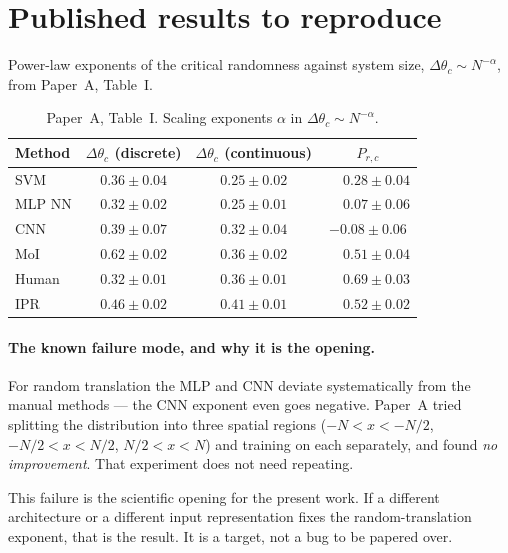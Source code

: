 \documentclass[11pt]{article}
\newcommand{\dthetac}{\Delta\theta_{c}}             %
\newcommand{\Prandc}{P_{r,c}}                       %
\begin{document}
\section{Published results to reproduce}
\label{sec:published}

Power-law exponents of the critical randomness against system size,
$\dthetac \sim N^{-\alpha}$, from Paper~A, Table~I.

\begin{table}[h]
\centering
\begin{tabular}{lccc}
\toprule
\textbf{Method} & $\dthetac$ (discrete) & $\dthetac$ (continuous) & $\Prandc$ \\
\midrule
SVM    & $0.36 \pm 0.04$ & $0.25 \pm 0.02$ & $\phantom{-}0.28 \pm 0.04$ \\
MLP NN & $0.32 \pm 0.02$ & $0.25 \pm 0.01$ & $\phantom{-}0.07 \pm 0.06$ \\
CNN    & $0.39 \pm 0.07$ & $0.32 \pm 0.04$ & $-0.08 \pm 0.06$ \\
MoI    & $0.62 \pm 0.02$ & $0.36 \pm 0.02$ & $\phantom{-}0.51 \pm 0.04$ \\
Human  & $0.32 \pm 0.01$ & $0.36 \pm 0.01$ & $\phantom{-}0.69 \pm 0.03$ \\
IPR    & $0.46 \pm 0.02$ & $0.41 \pm 0.01$ & $\phantom{-}0.52 \pm 0.02$ \\
\bottomrule
\end{tabular}
\caption{Paper~A, Table~I. Scaling exponents $\alpha$ in $\dthetac \sim N^{-\alpha}$.}
\label{tab:paperA}
\end{table}

\paragraph{The known failure mode, and why it is the opening.}
For random translation the MLP and CNN deviate systematically from the manual
methods --- the CNN exponent even goes negative. Paper~A tried splitting the
distribution into three spatial regions ($-N<x<-N/2$, $-N/2<x<N/2$,
$N/2<x<N$) and training on each separately, and found \emph{no improvement}.
That experiment does not need repeating.

This failure is the scientific opening for the present work. If a different
architecture or a different input representation fixes the random-translation
exponent, that is the result. It is a target, not a bug to be papered over.
\end{document}
